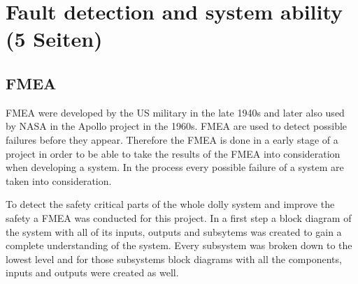 \documentclass[ExampleMasters.tex]{subfiles}
\begin{document}
\clearpage
{\pagestyle{empty}\cleardoublepage}%

\chapter{Fault detection and system ability (5 Seiten)}
\label{chap:fault_detection}
\section{\acrfull{FMEA}}
\label{sec:FMEA}
\gls{FMEA} were developed by the US military in the late 1940s and later also used by NASA in the Apollo project in the 1960s.
\gls{FMEA} are used to detect possible failures before they appear. Therefore the \gls{FMEA} is done in a early stage of a project in order to be able to take the results of the \gls{FMEA} into consideration when developing a system. In the process every possible failure of a system are taken into consideration. 

To detect the safety critical parts of the whole dolly system and improve the safety a \gls{FMEA} was conducted for this project.
In a first step a block diagram of the system with all of its inputs, outputs and subsytems was created to gain a complete understanding of the system. Every subsystem was broken down to the lowest level and for those subsystems block diagrams with all the components, inputs and outputs were created as well.
\end{document}
